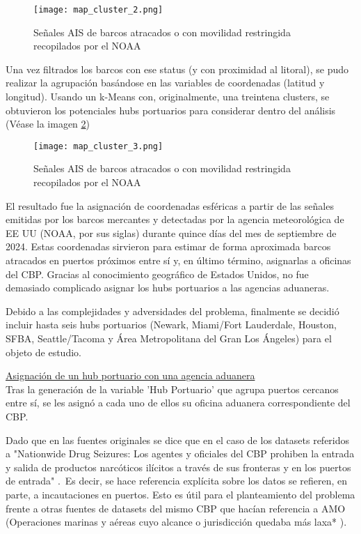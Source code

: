\documentclass[12pt]{article}
\begin{document}
		\begin{figure}[H]
			\caption{\label{map_cluster_2} Señales AIS de barcos atracados o con movilidad restringida recopilados por el NOAA}
			\centering
			\hspace*{1cm}
			\texttt{[image: map\_cluster\_2.png]}
		\end{figure}
	
		Una vez filtrados los barcos con ese status (y con proximidad al litoral), se pudo realizar la agrupación basándose en las variables de coordenadas (latitud y longitud). Usando un k-Means con, originalmente, una treintena clusters, se obtuvieron los potenciales hubs portuarios para considerar dentro del análisis (Véase la imagen \ref{map_cluster_3})
		
		\begin{figure}[H]
			\caption{\label{map_cluster_3} Señales AIS de barcos atracados o con movilidad restringida recopilados por el NOAA}
			\centering
			\texttt{[image: map\_cluster\_3.png]}
		\end{figure}
		
		 El resultado fue la asignación de coordenadas esféricas a partir de las señales emitidas por los barcos mercantes y detectadas por la agencia meteorológica de EE UU (NOAA, por sus siglas) durante quince días del mes de septiembre de 2024. Estas coordenadas sirvieron para estimar de forma aproximada barcos atracados en puertos próximos entre sí y, en último término, asignarlas a oficinas del CBP. Gracias al conocimiento geográfico de Estados Unidos, no fue demasiado complicado asignar los hubs portuarios a las agencias aduaneras.
		 
		 Debido a las complejidades y adversidades del problema, finalmente se decidió incluir hasta seis hubs portuarios (Newark, Miami/Fort Lauderdale, Houston, SFBA, Seattle/Tacoma y Área Metropolitana del Gran Los Ángeles) para el objeto de estudio.
		

		\underline{Asignación de un hub portuario con una agencia aduanera}\\
		Tras la generación de la variable 'Hub Portuario' que agrupa puertos cercanos entre sí, se les asignó a cada uno de ellos su oficina aduanera correspondiente del CBP.
		
		Dado que en las fuentes originales se dice que en el caso de los datasets referidos a "Nationwide Drug Seizures: Los agentes y oficiales del CBP prohiben la entrada y salida de productos narcóticos ilícitos a través de sus fronteras y en los puertos de entrada" \cite[CBP Nationwide]{}.\ Es decir, se hace referencia explícita sobre los datos se refieren, en parte, a incautaciones en puertos. Esto es útil para el planteamiento del problema frente a otras fuentes de datasets del mismo CBP que hacían referencia a AMO (Operaciones marinas y aéreas cuyo alcance o jurisdicción quedaba más laxa* \cite[]{}).
		
\end{document}
